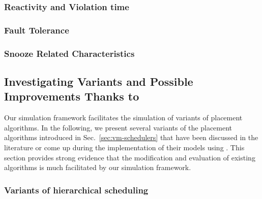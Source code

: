 %   
%


\subsubsection{Reactivity and Violation time}

\subsubsection{Fault Tolerance}
\MS[JP]{}

\subsubsection{Snooze Related Characteristics}

\subsection{Investigating Variants and Possible Improvements Thanks to
\vmps}

Our simulation framework facilitates the simulation of variants of
placement algorithms. In the following, we present several variants of
the placement algorithms introduced in Sec.~\ref{sec:vm-schedulers}
that have been discussed in the literature or come up during the
implementation of their models using \vmps. This section provides
strong evidence that the modification and evaluation of existing
algorithms is much facilitated by our simulation framework.



\subsubsection{Variants of hierarchical scheduling}
\label{sec:snoozeVariants}

